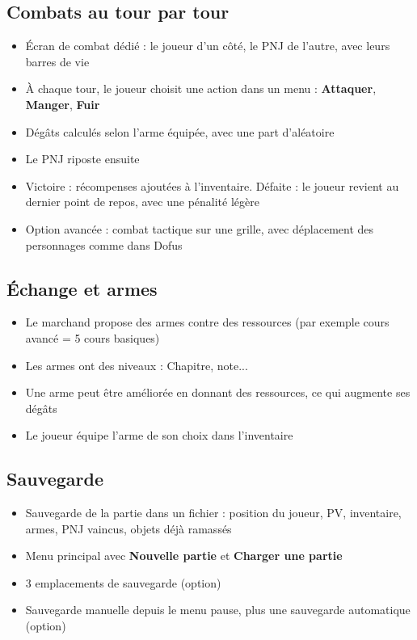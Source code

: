 \documentclass[11pt,a4paper]{article}
\begin{document}
\begin{itemize}
\subsection{Combats au tour par tour}
\begin{itemize}
    \item Écran de combat dédié : le joueur d'un côté, le PNJ de l'autre, avec leurs barres de vie
    \item À chaque tour, le joueur choisit une action dans un menu : \textbf{Attaquer}, \textbf{Manger}, \textbf{Fuir}
    \item Dégâts calculés selon l'arme équipée, avec une part d'aléatoire
    \item Le PNJ riposte ensuite
    \item Victoire : récompenses ajoutées à l'inventaire. Défaite : le joueur revient au dernier point de repos, avec une pénalité légère
    \item Option avancée : combat tactique sur une grille, avec déplacement des personnages comme dans Dofus
\end{itemize}

\subsection{Échange et armes}
\begin{itemize}
    \item Le marchand propose des armes contre des ressources (par exemple cours avancé = 5 cours basiques)
    \item Les armes ont des niveaux : Chapitre, note...
    \item Une arme peut être améliorée en donnant des ressources, ce qui augmente ses dégâts
    \item Le joueur équipe l'arme de son choix dans l'inventaire
\end{itemize}

\subsection{Sauvegarde}
\begin{itemize}
    \item Sauvegarde de la partie dans un fichier : position du joueur, PV, inventaire, armes, PNJ vaincus, objets déjà ramassés
    \item Menu principal avec \textbf{Nouvelle partie} et \textbf{Charger une partie}
    \item 3 emplacements de sauvegarde (option)
    \item Sauvegarde manuelle depuis le menu pause, plus une sauvegarde automatique (option)
\end{itemize}


\end{itemize}
\end{document}
